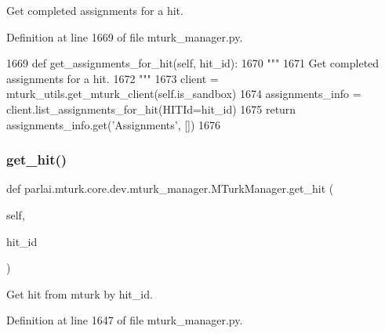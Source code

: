 \begin{DoxyVerb}Get completed assignments for a hit.
\end{DoxyVerb}
 

Definition at line 1669 of file mturk\+\_\+manager.\+py.


\begin{DoxyCode}
1669     \textcolor{keyword}{def }get\_assignments\_for\_hit(self, hit\_id):
1670         \textcolor{stringliteral}{"""}
1671 \textcolor{stringliteral}{        Get completed assignments for a hit.}
1672 \textcolor{stringliteral}{        """}
1673         client = mturk\_utils.get\_mturk\_client(self.is\_sandbox)
1674         assignments\_info = client.list\_assignments\_for\_hit(HITId=hit\_id)
1675         \textcolor{keywordflow}{return} assignments\_info.get(\textcolor{stringliteral}{'Assignments'}, [])
1676 
\end{DoxyCode}
\mbox{\label{classparlai_1_1mturk_1_1core_1_1dev_1_1mturk__manager_1_1MTurkManager_a34c0e6ddbe21c6d21e73eeadc90c3d64}} 
\subsubsection{\texorpdfstring{get\+\_\+hit()}{get\_hit()}}
{\footnotesize\ttfamily def parlai.\+mturk.\+core.\+dev.\+mturk\+\_\+manager.\+M\+Turk\+Manager.\+get\+\_\+hit (\begin{DoxyParamCaption}\item[{}]{self,  }\item[{}]{hit\+\_\+id }\end{DoxyParamCaption})}

\begin{DoxyVerb}Get hit from mturk by hit_id.
\end{DoxyVerb}
 

Definition at line 1647 of file mturk\+\_\+manager.\+py.


